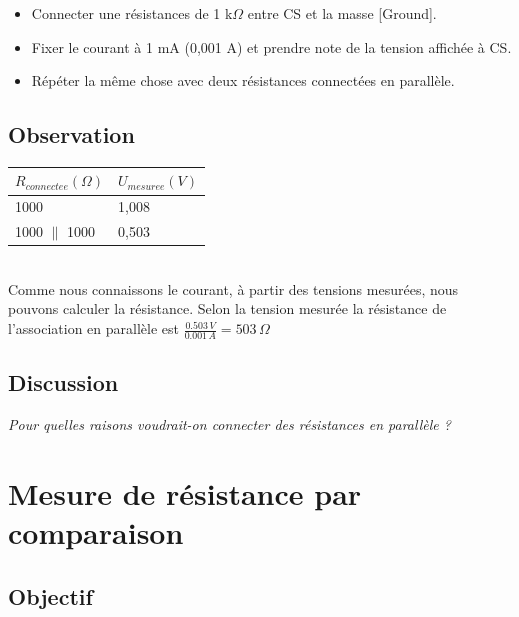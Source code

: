 \documentclass{book}
\begin{document}
\begin{itemize}
  \item Connecter une résistances de 1 k$\Omega$  entre CS et la masse [Ground].
  \item Fixer le courant à 1 mA (0,001 A) et prendre note de la tension affichée à CS.
  \item Répéter la même chose avec deux résistances connectées en parallèle.
\end{itemize}

\subsection{Observation}


\begin{tabular}{|l|l|}
\hline
\textbf{$R_{connectee}(\Omega)$}&\textbf{$U_{mesuree}(V)$}
\\ \hline
1000&1,008
\\ \hline
1000 $\parallel$ 1000&0,503
\\ \hline
\end{tabular}\\[0.5em]
Comme nous connaissons le courant, à partir des tensions mesurées, nous pouvons calculer la résistance. Selon la tension mesurée la résistance de l'association en parallèle est $\frac{0.503\, V}{0.001\, A}=503\,\Omega$

\subsection{Discussion}


\emph{Pour quelles raisons voudrait-on connecter des résistances en parallèle ?}







\section{Mesure de résistance par comparaison}


 \label{sec:Measure-resistance-by}

\subsection{Objectif}
\end{document}
